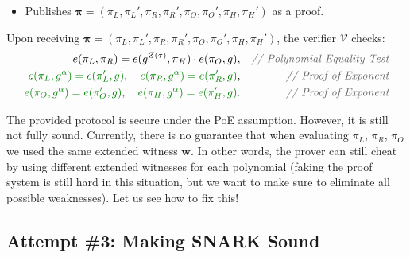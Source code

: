 \documentclass[../lecture-notes.tex]{subfiles}
\begin{document}
\begin{tcolorbox}
\begin{itemize}[label=]
\begin{align*}
            \pi_R \gets g^{R(\tau)}, & \quad\textcolor{green!50!black}{\pi_R' \gets g^{\alpha R(\tau)}} \\
            \pi_O \gets g^{O(\tau)}, & \quad\textcolor{green!50!black}{\pi_O' \gets g^{\alpha O(\tau)}} \\
            \pi_H \gets g^{H(\tau)}, & \quad\textcolor{green!50!black}{\pi_H' \gets g^{\alpha H(\tau)}}.
        \end{align*}
        using powers $\{g^{\tau^i}\}_{i \in [d]}$ and $\{g^{\alpha\tau^i}\}_{i \in [d]}$ from the proper parameters $\mathsf{pp}$.
        \item Publishes $\boldsymbol{\pi} = (\pi_L,\pi_L',\pi_R,\pi_R',\pi_O,\pi_O',\pi_H,\pi_H')$ as a proof.
    \end{itemize}
    Upon receiving $\boldsymbol{\pi} = (\pi_L,\pi_L',\pi_R,\pi_R',\pi_O,\pi_O',\pi_H,\pi_H')$, the verifier $\mathcal{V}$ checks:
    \begin{align*}
        e(\pi_L, \pi_R) = e(g^{Z(\tau)}, \pi_H) \cdot e(\pi_O, g), && \textcolor{gray!80!black}{\textit{// Polynomial Equality Test}} \\
        \textcolor{green!50!black}{e(\pi_L, g^{\alpha}) = e(\pi_L', g)}, \quad \textcolor{green!50!black}{e(\pi_R, g^{\alpha}) = e(\pi_R', g)}, && \textcolor{gray!80!black}{\textit{// Proof of Exponent}} \\
        \textcolor{green!50!black}{e(\pi_O, g^{\alpha}) = e(\pi_O', g)}, \quad \textcolor{green!50!black}{e(\pi_H, g^{\alpha}) = e(\pi_H', g)}. && \textcolor{gray!80!black}{\textit{// Proof of Exponent}}
    \end{align*}
\end{tcolorbox}

The provided protocol is secure under the PoE assumption. However, it is still not fully sound. Currently, there is no guarantee that when evaluating $\pi_L$, $\pi_R$, $\pi_O$ we used the same extended witness $\mathbf{w}$. In other words, the prover can still cheat by using different extended witnesses for each polynomial (faking the proof system is still hard in this situation, but we want to make sure to eliminate all possible weaknesses). Let us see how to fix this!

\subsection{Attempt \#3: Making SNARK Sound}
\end{document}
